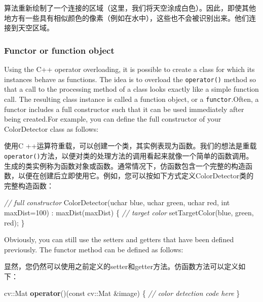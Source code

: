 \documentclass[]{article}
\newenvironment{Shaded}{}{}
\newcommand{\AttributeTok}[1]{\textcolor[rgb]{0.49,0.56,0.16}{#1}}
\newcommand{\CommentTok}[1]{\textcolor[rgb]{0.38,0.63,0.69}{\textit{#1}}}
\newcommand{\DataTypeTok}[1]{\textcolor[rgb]{0.56,0.13,0.00}{#1}}
\newcommand{\DecValTok}[1]{\textcolor[rgb]{0.25,0.63,0.44}{#1}}
\newcommand{\ExtensionTok}[1]{#1}
\newcommand{\KeywordTok}[1]{\textcolor[rgb]{0.00,0.44,0.13}{\textbf{#1}}}
\newcommand{\NormalTok}[1]{#1}
\begin{document}
算法重新绘制了一个连接的区域（这里，我们将天空涂成白色）。因此，即使其他地方有一些具有相似颜色的像素（例如在水中），这些也不会被识别出来。他们连接到天空区域。

\hypertarget{header-n1252}{%
\subsubsection{Functor or function object}\label{header-n1252}}

Using the C++ operator overloading, it is possible to create a class for
which its instances behave as functions. The idea is to overload the
\texttt{operator()} method so that a call to the processing method of a
class looks exactly like a simple function call. The resulting class
instance is called a function object, or a \texttt{functor}.Often, a
functor includes a full constructor such that it can be used immediately
after being created.For example, you can define the full constructor of
your ColorDetector class as follows:

使用C
++运算符重载，可以创建一个类，其实例表现为函数。我们的想法是重载\texttt{operator()}方法，以便对类的处理方法的调用看起来就像一个简单的函数调用。生成的类实例称为函数对象或函数。通常情况下，仿函数包含一个完整的构造函数，以便在创建后立即使用它。例如，您可以按如下方式定义ColorDetector类的完整构造函数：

\begin{Shaded}
\begin{Highlighting}[]
\CommentTok{// full constructor}
\NormalTok{ColorDetector(}\ExtensionTok{uchar}\NormalTok{ blue, }\ExtensionTok{uchar}\NormalTok{ green, }\ExtensionTok{uchar}\NormalTok{ red, }\DataTypeTok{int}\NormalTok{ maxDist=}\DecValTok{100}\NormalTok{)}
\NormalTok{    : maxDist(maxDist) \{}
	\CommentTok{// target color}
\NormalTok{	setTargetColor(blue, green, red);}
\NormalTok{\}}
\end{Highlighting}
\end{Shaded}

Obviously, you can still use the setters and getters that have been
defined previously. The functor method can be defined as follows:

显然，您仍然可以使用之前定义的setter和getter方法。仿函数方法可以定义如下：

\begin{Shaded}
\begin{Highlighting}[]
\NormalTok{cv::Mat }\KeywordTok{operator}\NormalTok{()(}\AttributeTok{const}\NormalTok{ cv::Mat &image) \{}
	\CommentTok{// color detection code here}
\NormalTok{\}}
\end{Highlighting}
\end{Shaded}
\end{document}
